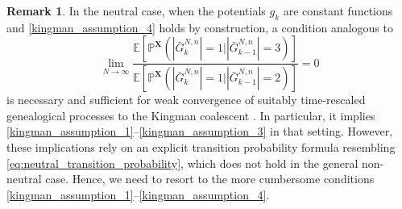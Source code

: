 \documentclass[a4paper,11pt]{article}
\theoremstyle{definition}
\newtheorem{rem}{Remark}
\newcommand{\bbP}{\mathbb{P}}
\newcommand{\bbE}{\mathbb{E}}
\newcommand{\bfX}{\mathbf{X}}
\begin{document}
\begin{rem}
In the neutral case, when the potentials $g_k$ are constant functions and \eqref{kingman_assumption_4} holds by construction, a condition analogous to
\begin{equation*}
\lim_{ N \to \infty }\frac{ \bbE[ \bbP^{ \bfX }( | \bar{ G }_k^{ N, n } | = 1 \big| | \bar{ G }_{ k - 1 }^{ N, n } | = 3 ) ] }{ \bbE[ \bbP^{ \bfX }( | \bar{ G }^{ N, n }_k | = 1 \big| | \bar{ G }_{ k - 1 }^{ N, n } | = 2 ) ] } = 0
\end{equation*}
is necessary and sufficient for weak convergence of suitably time-rescaled genealogical processes to the Kingman coalescent \cite{mohle2003}.
In particular, it implies \eqref{kingman_assumption_1}--\eqref{kingman_assumption_3} in that setting.
However, these implications rely on an explicit transition probability formula resembling \eqref{eq:neutral_transition_probability}, which does not hold in the general non-neutral case.
Hence, we need to resort to the more cumbersome conditions \eqref{kingman_assumption_1}--\eqref{kingman_assumption_4}.
\end{rem}
\end{document}
